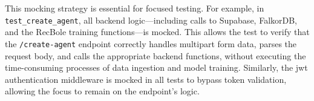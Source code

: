 This mocking strategy is essential for focused testing. For example, in \texttt{test\_create\_agent}, all backend logic---including calls to Supabase, FalkorDB, and the RecBole training functions---is mocked. This allows the test to verify that the \texttt{/create-agent} endpoint correctly handles multipart form data, parses the request body, and calls the appropriate backend functions, without executing the time-consuming processes of data ingestion and model training. Similarly, the \acs{jwt} authentication middleware is mocked in all tests to bypass token validation, allowing the focus to remain on the endpoint's logic.